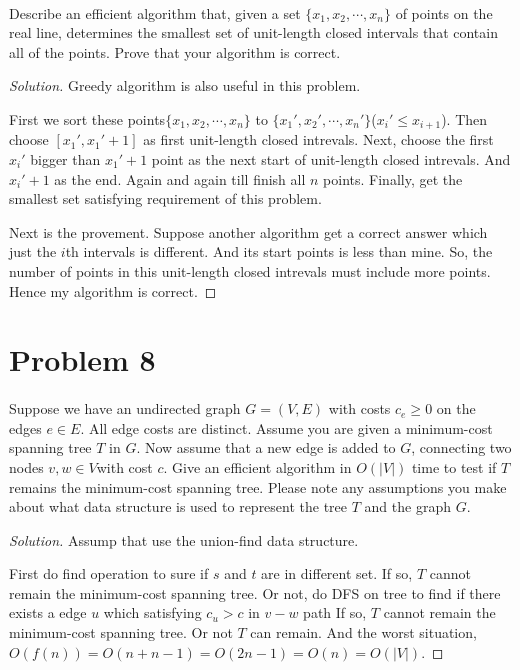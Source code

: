 \documentclass[a4paper]{article}
\newenvironment{solution}
  {\renewcommand\qedsymbol{$\blacksquare$}\begin{proof}[Solution]}
  {\end{proof}}
\begin{document}
\paragraph{}
Describe an efficient algorithm that, given a set $\{x_{1} , x_{2} ,\cdots, x_{n} \}$ of points on the real line, determines
the smallest set of unit-length closed intervals that contain all of the points. Prove that your algorithm is
correct.
\begin{solution}
  Greedy algorithm is also useful in this problem.

  First we sort these points$\{x_{1},x_{2},\cdots ,x_{n}\}$ to $\{x_{1}',x_{2}',\cdots,x_{n}'\}$($x_{i}'\le x_{i+1}$).
  Then choose $\left[x_{1}',x_{1}'+1\right]$ as first unit-length closed intrevals. Next, choose the first $x_{i}'$ bigger than $x_{1}'+1$ point as
  the next start of unit-length closed intrevals. And $x_{i}'+1$ as the end. Again and again till finish all $n$ points. Finally, get the smallest set satisfying requirement of this problem.

  Next is the provement.
  Suppose another algorithm get a correct answer which just the $i$th intervals is different. And its start points is less than mine.
  So, the number of points in this unit-length closed intrevals must include more points. Hence my algorithm is correct.
\end{solution}

\section*{Problem 8}
\paragraph{}
Suppose we have an undirected graph $G = (V, E)$ with costs $c_{e} \ge 0$ on the edges $e\in E$. All edge
costs are distinct. Assume you are given a minimum-cost spanning tree $T$ in $G$. Now assume that a new
edge is added to $G$, connecting two nodes $v, w \in V $with cost $c$. Give an efficient algorithm in $O(\lvert V \rvert)$ time to
test if $T$ remains the minimum-cost spanning tree. Please note any assumptions you make about what data
structure is used to represent the tree $T$ and the graph $G$.
\begin{solution}
  Assump that use the union-find data structure.

  First do find operation to sure if $s$ and $t$ are in different set. If
  so, $T$ cannot remain the minimum-cost spanning tree. Or not, do DFS on tree to find if there exists a edge $u$ which satisfying $c_{u}>c$ in $v-w$ path
  If so, $T$ cannot remain the minimum-cost spanning tree. Or not $T $ can remain. And the worst situation, $O(f(n))=O(n+n-1)=O(2n-1)=O(n)=O(\lvert V\rvert)$.
\end{solution}
\end{document}
